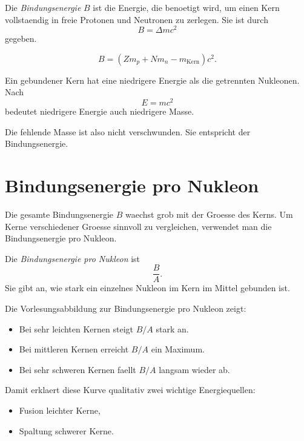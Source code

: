 \begin{definitionbox}
Die \emph{Bindungsenergie} $B$ ist die Energie, die benoetigt wird, um einen Kern
vollstaendig in freie Protonen und Neutronen zu zerlegen.
Sie ist durch
\[
    B = \Delta m c^2
\]
gegeben.
\end{definitionbox}

\begin{formulabox}
\[
    B
    =
    \left(
        Zm_p + Nm_n - m_{\mathrm{Kern}}
    \right)c^2.
\]
\end{formulabox}

\begin{conceptbox}
Ein gebundener Kern hat eine niedrigere Energie als die getrennten Nukleonen.
Nach
\[
    E = mc^2
\]
bedeutet niedrigere Energie auch niedrigere Masse.

Die fehlende Masse ist also nicht verschwunden.
Sie entspricht der Bindungsenergie.
\end{conceptbox}

\section{Bindungsenergie pro Nukleon}

Die gesamte Bindungsenergie $B$ waechst grob mit der Groesse des Kerns.
Um Kerne verschiedener Groesse sinnvoll zu vergleichen, verwendet man die
Bindungsenergie pro Nukleon.

\begin{definitionbox}
Die \emph{Bindungsenergie pro Nukleon} ist
\[
    \frac{B}{A}.
\]
Sie gibt an, wie stark ein einzelnes Nukleon im Kern im Mittel gebunden ist.
\end{definitionbox}

\begin{conceptbox}
Die Vorlesungsabbildung zur Bindungsenergie pro Nukleon zeigt:
\begin{itemize}
    \item Bei sehr leichten Kernen steigt $B/A$ stark an.
    \item Bei mittleren Kernen erreicht $B/A$ ein Maximum.
    \item Bei sehr schweren Kernen faellt $B/A$ langsam wieder ab.
\end{itemize}

Damit erklaert diese Kurve qualitativ zwei wichtige Energiequellen:
\begin{itemize}
    \item Fusion leichter Kerne,
    \item Spaltung schwerer Kerne.
\end{itemize}
\end{conceptbox}

